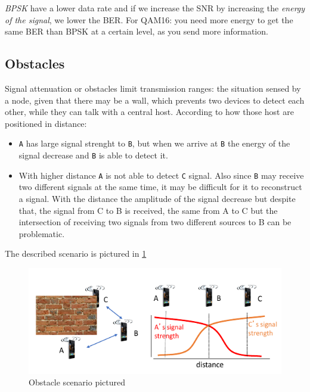 \documentclass[10pt,a4paper]{report}
\theoremstyle{definition}
\begin{document}
\textit{BPSK} have a lower data rate and if we increase the SNR by increasing the \textit{energy of the signal}, we lower the BER. For QAM16: you need more energy to get the same BER than BPSK at a certain level, as you send more information.
\subsection{Obstacles}\label{sec:obstacles}
Signal attenuation or obstacles limit transmission ranges: the situation sensed by a node, given that there may be a wall, which prevents two devices to detect each other, while they can talk with a central host.
According to how those host are positioned in distance:
\begin{itemize}
	\item 
	\texttt{A} has large signal strenght to \texttt{B}, but when we arrive at \texttt{B} the energy of the signal decrease and \texttt{B} is able to detect it.
	\item 
	With higher distance \texttt{A} is not able to detect \texttt{C} signal.
	Also since \texttt{B} may receive two different signals at the same time, it may be difficult for it to reconstruct a signal.
	With the distance the amplitude of the signal decrease but despite that, the signal from C to B is received, the same from A to C but the intersection of receiving two signals from two different sources to B can be problematic.
\end{itemize}
The described scenario is pictured in \ref{obstacle-scenario}

	\begin{figure}[h]
	\centering\includegraphics[scale=0.60]{images/Pasted image 20230224165435.png}
	\caption{Obstacle scenario pictured}
	\label{obstacle-scenario}
\end{figure}
\end{document}
